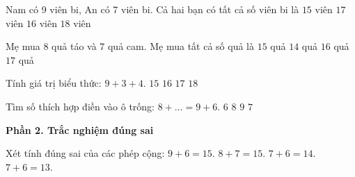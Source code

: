 \begin{ex} %
Nam có 9 viên bi, An có 7 viên bi. Cả hai bạn có tất cả số viên bi là
\choice
{$15$ viên}
{$17$ viên}
{\True $16$ viên}
{$18$ viên}
\end{ex}

\begin{ex} %
Mẹ mua 8 quả táo và 7 quả cam. Mẹ mua tất cả số quả là
\choice
{\True $15$ quả}
{$14$ quả}
{$16$ quả}
{$17$ quả}
\end{ex}

\begin{ex} %
Tính giá trị biểu thức: $9 + 3 + 4$.
\choice
{$15$}
{\True $16$}
{$17$}
{$18$}
\end{ex}

\begin{ex} %
Tìm số thích hợp điền vào ô trống: $8 + \dots = 9 + 6$.
\choice
{$6$}
{$8$}
{$9$}
{\True $7$}
\end{ex}

\textbf{Phần 2. Trắc nghiệm đúng sai}

\begin{ex} %
Xét tính đúng sai của các phép cộng:
\choiceTF
{\True $9 + 6 = 15$.}
{\True $8 + 7 = 15$.}
{$7 + 6 = 14$.}
{\True $7 + 6 = 13$.}
\end{ex}


